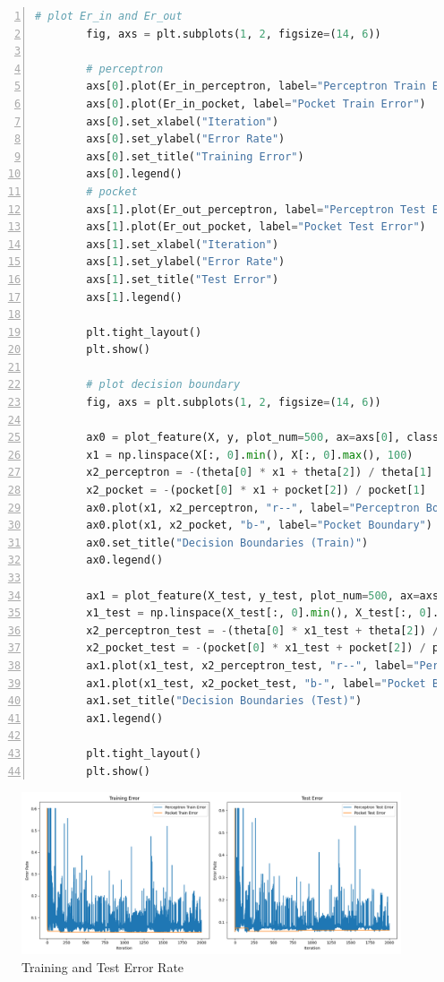 \documentclass[12pt, a4paper, oneside]{article}
\newcounter{problemname}
\newenvironment{problem}{\stepcounter{problemname}\par\noindent{Problem \arabic{problemname}. }}{\par}
\begin{document}
\begin{problem}
\begin{lstlisting}[language=Python, basicstyle=\small, numbers=left, stepnumber=1, numbersep=5pt, columns=fullflexible, keepspaces=true, lineskip=0.1em]
        # plot Er_in and Er_out
        fig, axs = plt.subplots(1, 2, figsize=(14, 6))
                
        # perceptron
        axs[0].plot(Er_in_perceptron, label="Perceptron Train Error")
        axs[0].plot(Er_in_pocket, label="Pocket Train Error")
        axs[0].set_xlabel("Iteration")
        axs[0].set_ylabel("Error Rate")
        axs[0].set_title("Training Error")
        axs[0].legend()
        # pocket
        axs[1].plot(Er_out_perceptron, label="Perceptron Test Error")
        axs[1].plot(Er_out_pocket, label="Pocket Test Error")
        axs[1].set_xlabel("Iteration")
        axs[1].set_ylabel("Error Rate")
        axs[1].set_title("Test Error")
        axs[1].legend()
                
        plt.tight_layout()
        plt.show()
                
        # plot decision boundary
        fig, axs = plt.subplots(1, 2, figsize=(14, 6))
                
        ax0 = plot_feature(X, y, plot_num=500, ax=axs[0], classes=np.unique(y))
        x1 = np.linspace(X[:, 0].min(), X[:, 0].max(), 100)
        x2_perceptron = -(theta[0] * x1 + theta[2]) / theta[1]
        x2_pocket = -(pocket[0] * x1 + pocket[2]) / pocket[1]
        ax0.plot(x1, x2_perceptron, "r--", label="Perceptron Boundary")
        ax0.plot(x1, x2_pocket, "b-", label="Pocket Boundary")
        ax0.set_title("Decision Boundaries (Train)")
        ax0.legend()
                
        ax1 = plot_feature(X_test, y_test, plot_num=500, ax=axs[1], classes=np.unique(y_test))
        x1_test = np.linspace(X_test[:, 0].min(), X_test[:, 0].max(), 100)
        x2_perceptron_test = -(theta[0] * x1_test + theta[2]) / theta[1]
        x2_pocket_test = -(pocket[0] * x1_test + pocket[2]) / pocket[1]
        ax1.plot(x1_test, x2_perceptron_test, "r--", label="Perceptron Boundary")
        ax1.plot(x1_test, x2_pocket_test, "b-", label="Pocket Boundary")
        ax1.set_title("Decision Boundaries (Test)")
        ax1.legend()
                
        plt.tight_layout()
        plt.show()
        \end{lstlisting}
        \begin{figure}[htbp]
            \centering
            \includegraphics[width=1\textwidth]{../code_source/p5/error_by_iteration.png}
            \caption{Training and Test Error Rate}
        \end{figure}


\end{problem}
\end{document}
